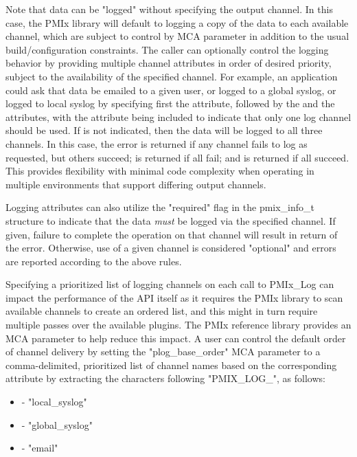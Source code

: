 \par
Note that data can be "logged" without specifying the output channel. In this case, the PMIx library will default to logging a copy of the data to each available channel, which are subject to control by MCA parameter in addition to the usual build/configuration constraints. The caller can optionally control the logging behavior by providing multiple channel attributes in order of desired priority, subject to the availability of the specified channel. For example, an application could ask that data be emailed to a given user, or logged to a global syslog, or logged to local syslog by specifying first the  attribute, followed by the  and the  attributes, with the  attribute being included to indicate that only one log channel should be used. If  is not indicated, then the data will be logged to all three channels. In this case, the  error is returned if any channel fails to log as requested, but others succeed;  is returned if all fail; and  is returned if all succeed. This provides flexibility with minimal code complexity when operating in multiple environments that support differing output channels.

\par
Logging attributes can also utilize the "required" flag in the pmix_info_t structure to indicate that the data \emph{must} be logged via the specified channel. If given, failure to complete the operation on that channel will result in return of the  error. Otherwise, use of a given channel is considered "optional" and errors are reported according to the above rules.

Specifying a prioritized list of logging channels on each call to PMIx_Log can impact the performance of the API itself as it requires the PMIx library to scan available channels to create an ordered list, and this might in turn require multiple passes over the available plugins. The PMIx reference library provides an MCA parameter to help reduce this impact. A user can control the default order of channel delivery by setting the "plog_base_order" MCA parameter to a comma-delimited, prioritized list of channel names based on the corresponding attribute by extracting the characters following "PMIX_LOG_", as follows:

\begin{itemize}
\item {} - "local_syslog"
\item {} - "global_syslog"
\item {} - "email"
\end{itemize}

